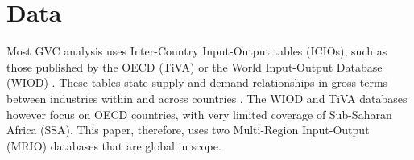 \documentclass[a4paper]{article}
\begin{document}
\section{Data}

Most GVC analysis uses Inter-Country Input-Output tables (ICIOs), such as those published by the OECD (TiVA) or the World Input-Output Database (WIOD)  \citep{timmer2012world}. These tables state supply and demand relationships in gross terms between industries within and across countries \citep{Kummritz2014}. The WIOD and TiVA databases however focus on OECD countries, with very limited coverage of Sub-Saharan Africa (SSA). This paper, therefore, uses two Multi-Region Input-Output (MRIO) databases that are global in scope. \newline %
\end{document}
